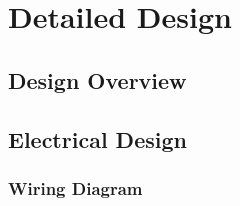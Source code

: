 \chapter{Detailed Design}

\section{Design Overview}

\section{Electrical Design}

\subsection{Wiring Diagram}